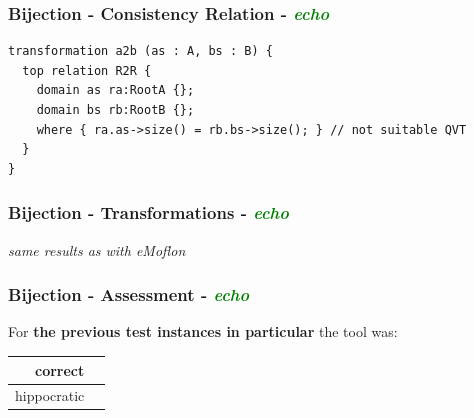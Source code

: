\documentclass{beamer}
\newcommand{\cmark}{\ding{51}}%
\begin{document}
\begin{frame}[fragile]
\frametitle{Bijection - \textbf{Consistency Relation} - \textbf{\textit{\textcolor{green}{echo}}}}

\begin{lstlisting}[language=QVT]
transformation a2b (as : A, bs : B) {
  top relation R2R { 
    domain as ra:RootA {};
    domain bs rb:RootB {};
    where { ra.as->size() = rb.bs->size(); } // not suitable QVT
  }
}
\end{lstlisting}

\end{frame}


\begin{frame}
\frametitle{Bijection - \textbf{Transformations} - \textbf{\textit{\textcolor{green}{echo}}}}

\begin{center}
\textit{same results as with eMoflon}
\end{center}

\end{frame}


\begin{frame}
\frametitle{Bijection - \textbf{Assessment} - \textbf{\textit{\textcolor{green}{echo}}}}

For \textbf{the previous test instances in particular} the tool was:

\begin{center}
\begin{tabular}{| r | c |}
  \hline                        
  correct & \cmark\\
  \hline
  hippocratic & \cmark\\
  \hline 
\end{tabular}
\end{center}

\end{frame}
\end{document}
